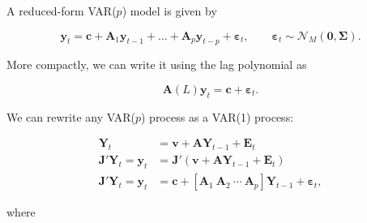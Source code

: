 A reduced-form VAR($p$) model is given by

\begin{equation}
	\bm{y}_t = \bm{c} + \bm{A}_1\bm{y}_{t-1} + \ldots + \bm{A}_p\bm{y}_{t-p} + \bm{\varepsilon}_t, \qquad \bm{\varepsilon}_t \sim \mathcal{N}_M(\bm{0},\bm{\Sigma}).
\end{equation}

More compactly, we can write it using the lag polynomial as 

\[
	\bm{A}(L)\bm{y}_t = \bm{c} + \bm{\varepsilon}_t.
\]

We can rewrite any VAR($p$) process as a VAR(1) process:

\begin{align*}
	\bm{Y}_t &= \bm{v} + \bm{AY}_{t-1} + \bm{E}_t \\
	\bm{J}'\bm{Y}_t = \bm{y}_t &= \bm{J}'(\bm{v} + \bm{AY}_{t-1} + \bm{E}_t) \\ 
	\bm{J}'\bm{Y}_t = \bm{y}_t &= \bm{c} + [\bm{A}_1 \: \bm{A}_2 \: \cdots \: \bm{A}_p]\bm{Y}_{t-1} + \bm{\varepsilon}_t,
\end{align*}

where 

